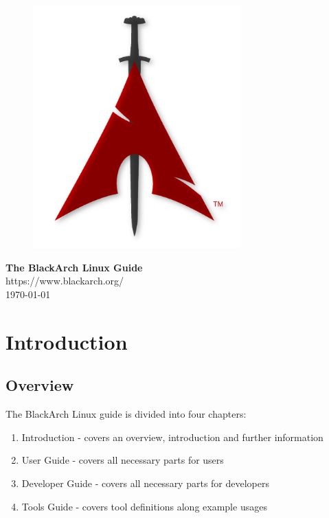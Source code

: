 \documentclass[a4paper, oneside, 11pt]{book}
\begin{document}
\pagestyle{empty}
\begin{center}
\begin{figure}[htbp]
\centering
\vspace{0.5cm}
\includegraphics[width=8cm]{logo.png}
\label{fig:logo}
\end{figure}
\vspace{0.5cm}
\Huge{\textbf{The BlackArch Linux Guide}}\\
\vspace{1cm}
\Large{\color{red}https://www.blackarch.org/}\\
\vspace{0.5cm}
\Large{\today}
\end{center}
\newpage
\tableofcontents
\newpage
\pagestyle{fancy}


\chapter{Introduction}

\section{Overview}
The BlackArch Linux guide is divided into four chapters:
\begin{enumerate}
\item Introduction - covers an overview, introduction and further information
\item User Guide - covers all necessary parts for users
\item Developer Guide - covers all necessary parts for developers
\item Tools Guide - covers tool definitions along example usages
\end{enumerate}
\end{document}
